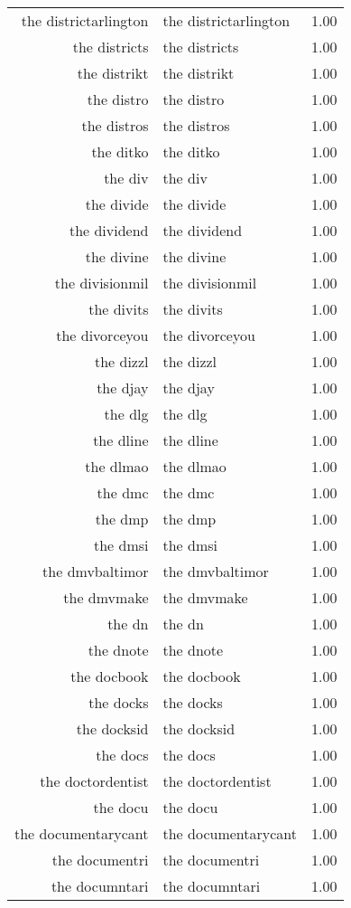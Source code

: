 \begin{table}[ht]
\begin{tabular}{rlr}
  the districtarlington & the districtarlington & 1.00 \\ 
  the districts & the districts & 1.00 \\ 
  the distrikt & the distrikt & 1.00 \\ 
  the distro & the distro & 1.00 \\ 
  the distros & the distros & 1.00 \\ 
  the ditko & the ditko & 1.00 \\ 
  the div & the div & 1.00 \\ 
  the divide & the divide & 1.00 \\ 
  the dividend & the dividend & 1.00 \\ 
  the divine & the divine & 1.00 \\ 
  the divisionmil & the divisionmil & 1.00 \\ 
  the divits & the divits & 1.00 \\ 
  the divorceyou & the divorceyou & 1.00 \\ 
  the dizzl & the dizzl & 1.00 \\ 
  the djay & the djay & 1.00 \\ 
  the dlg & the dlg & 1.00 \\ 
  the dline & the dline & 1.00 \\ 
  the dlmao & the dlmao & 1.00 \\ 
  the dmc & the dmc & 1.00 \\ 
  the dmp & the dmp & 1.00 \\ 
  the dmsi & the dmsi & 1.00 \\ 
  the dmvbaltimor & the dmvbaltimor & 1.00 \\ 
  the dmvmake & the dmvmake & 1.00 \\ 
  the dn & the dn & 1.00 \\ 
  the dnote & the dnote & 1.00 \\ 
  the docbook & the docbook & 1.00 \\ 
  the docks & the docks & 1.00 \\ 
  the docksid & the docksid & 1.00 \\ 
  the docs & the docs & 1.00 \\ 
  the doctordentist & the doctordentist & 1.00 \\ 
  the docu & the docu & 1.00 \\ 
  the documentarycant & the documentarycant & 1.00 \\ 
  the documentri & the documentri & 1.00 \\ 
  the documntari & the documntari & 1.00 \\ 

\end{tabular}
\end{table}
